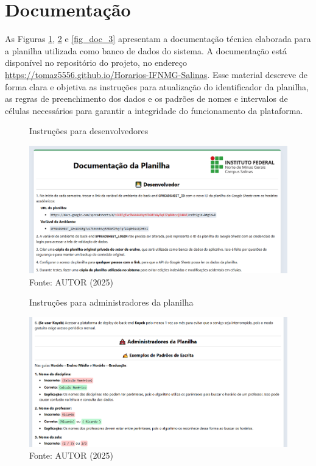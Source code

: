 \section{Documentação}

As Figuras \ref{fig_doc_1}, \ref{fig_doc_2} e \ref{fig_doc_3} apresentam a documentação técnica elaborada para a planilha utilizada como banco de dados do sistema. A documentação está disponível no repositório do projeto, no endereço \url{https://tomaz5556.github.io/Horarios-IFNMG-Salinas}. Esse material descreve de forma clara e objetiva as instruções para atualização do identificador da planilha, as regras de preenchimento dos dados e os padrões de nomes e intervalos de células necessários para garantir a integridade do funcionamento da plataforma.

\begin{figure}[H]
    \centering
    \caption{Instruções para desenvolvedores}
    \includegraphics[width=1\textwidth]{Figuras/doc-1.png}
    \caption*{Fonte: AUTOR (2025)}
    \label{fig_doc_1}
\end{figure}

\begin{figure}[htb]
    \centering
    \caption{Instruções para administradores da planilha}
    \includegraphics[width=1\textwidth]{Figuras/doc-2.png}
    \caption*{Fonte: AUTOR (2025)}
    \label{fig_doc_2}
\end{figure}

